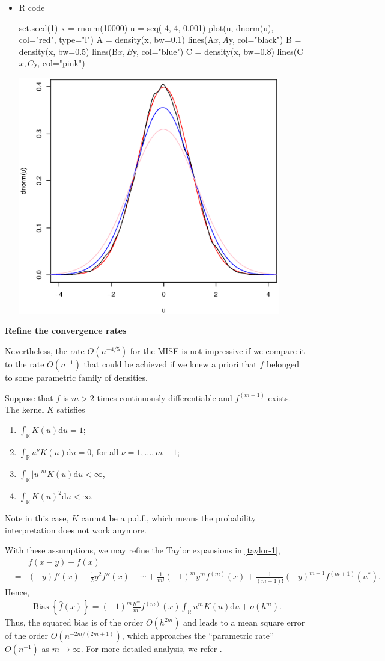 \documentclass[19pt,landscape]{article}
\newcommand{\R}{\mathbb{R}}
\DeclareMathOperator{\bs}{\mathrm{Bias}}
\begin{document}
\begin{itemize}
\item R code
\begin{Sinput}
set.seed(1)
x = rnorm(10000)
u = seq(-4, 4, 0.001)
plot(u, dnorm(u), col="red", type="l")
A = density(x, bw=0.1)
lines(A$x, A$y, col="black")
B = density(x, bw=0.5)
lines(B$x, B$y, col="blue")
C = density(x, bw=0.8)
lines(C$x, C$y, col="pink")
\end{Sinput}
\includegraphics[width=0.9\textwidth,height=0.5\textwidth]{bias_kernel.eps}
\end{itemize}


\newpage
{\LARGE\centerline{\textbf{Refine the convergence rates}}}
\vskip15pt
    \large 
    \noindent
    Nevertheless, the rate $O(n^{-4/5})$ for the MISE is not impressive if we compare it to the rate $O(n^{-1})$ that could be achieved if we knew a priori that $f$ belonged to some parametric family of densities. 

    Suppose that $f$ is $m>2$ times continuously differentiable and $f^{(m+1)}$ exists. The kernel $K$ satisfies 
    \begin{enumerate}
    \item $\int_{\R}K(u)\mathrm{d}u=1$;
    \item $\int_{\R}u^{\nu} K(u)\mathrm{d}u=0$, for all $\nu=1,\dots,m-1$;
    \item $\int_{\R}|u|^mK(u)\mathrm{d}u<\infty$,
    \item $\int_{\R}K(u)^2\mathrm{d}u<\infty$.
    \end{enumerate}
Note in this case, $K$ cannot be a p.d.f., which means the probability interpretation does not work anymore. 

With these assumptions, we may refine the Taylor expansions in \eqref{taylor-1}, 
\begin{eqnarray*}
    &&f(x-y)-f(x)\\
    &=&(-y)f'(x)+\frac12y^2f''(x)+\cdots+\frac1{m!}(-1)^my^mf^{(m)}(x)+\frac1{(m+1)!}(-y)^{m+1}f^{(m+1)}(u^*).
\end{eqnarray*} 
Hence, 
\begin{eqnarray}
    \bs\left\{\hat{f}(x)\right\}=(-1)^m\frac{h^m}{m!}f^{(m)}(x)\int_{\R}u^mK(u)\mathrm{d}u+o(h^m).
\end{eqnarray}
Thus, the squared bias is of the order $O(h^{2m})$ and leads to a mean square error of the order $O(n^{-2m/(2m+1)})$, which approaches the ``parametric rate'' $O(n^{-1})$ as $m\to\infty$. For more detailed analysis, we refer
    \cite[Chapter~24]{Vaart98}.
\end{document}
